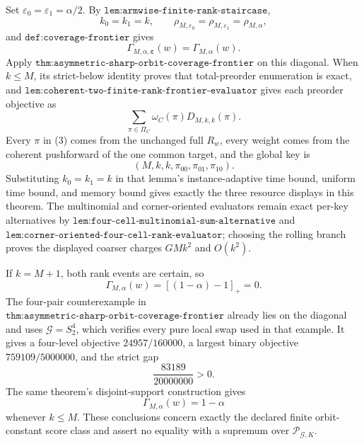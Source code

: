 Set \(\varepsilon_0=\varepsilon_1=\alpha/2\). By \(\texttt{lem:armwise-finite-rank-staircase}\),
\[
k_0=k_1=k,
\qquad
\rho_{M,\varepsilon_0}
=
\rho_{M,\varepsilon_1}
=
\rho_{M,\alpha},
\tag{1}
\]
and \(\texttt{def:coverage-frontier}\) gives
\[
\Gamma_{M,\alpha,\boldsymbol\varepsilon}(w)
=
\Gamma_{M,\alpha}(w).
\tag{2}
\]
Apply \(\texttt{thm:asymmetric-sharp-orbit-coverage-frontier}\) on this diagonal. When \(k\le M\), its strict-below identity proves that total-preorder enumeration is exact, and \(\texttt{lem:coherent-two-finite-rank-frontier-evaluator}\) gives each preorder objective as
\[
\sum_{\pi\in\Pi_C}\omega_C(\pi)D_{M,k,k}(\pi).
\tag{3}
\]
Every \(\pi\) in (3) comes from the unchanged full \(R_w\), every weight comes from the coherent pushforward of the one common target, and the global key is
\[
(M,k,k,\pi_{00},\pi_{01},\pi_{10}).
\tag{4}
\]
Substituting \(k_0=k_1=k\) in that lemma's instance-adaptive time bound, uniform time bound, and memory bound gives exactly the three resource displays in this theorem. The multinomial and corner-oriented evaluators remain exact per-key alternatives by \(\texttt{lem:four-cell-multinomial-sum-alternative}\) and \(\texttt{lem:corner-oriented-four-cell-rank-evaluator}\); choosing the rolling branch proves the displayed coarser charges \(GMk^2\) and \(O(k^2)\).

If \(k=M+1\), both rank events are certain, so
\[
\Gamma_{M,\alpha}(w)
=
[(1-\alpha)-1]_+
=
0.
\tag{5}
\]
The four-pair counterexample in \(\texttt{thm:asymmetric-sharp-orbit-coverage-frontier}\) already lies on the diagonal and uses \(\mathcal G=S_2^4\), which verifies every pure local swap used in that example. It gives a four-level objective \(24957/160000\), a largest binary objective \(759109/5000000\), and the strict gap
\[
\frac{83189}{20000000}>0.
\tag{6}
\]
The same theorem's disjoint-support construction gives
\[
\Gamma_{M,\alpha}(w)=1-\alpha
\]
whenever \(k\le M\). These conclusions concern exactly the declared finite orbit-constant score class and assert no equality with a supremum over \(\mathcal P_{\mathcal G,K}\).